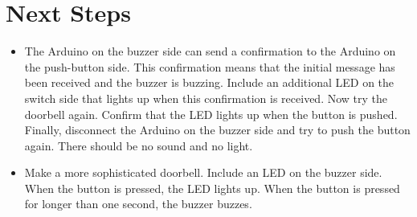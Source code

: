 \section{Next Steps}
\begin{itemize}
\item The Arduino on the buzzer side can send a confirmation to the Arduino on the push-button side.
This confirmation means that the initial message has been received and the buzzer is buzzing.
Include an additional LED on the switch side that lights up when this confirmation is received.
Now try the doorbell again.
Confirm that the LED lights up when the button is pushed.
Finally, disconnect the Arduino on the buzzer side and try to push the button again.
There should be no sound and no light.
\item Make a more sophisticated doorbell.
Include an LED on the buzzer side.
When the button is pressed, the LED lights up.
When the button is pressed for longer than one second, the buzzer buzzes.
\end{itemize}





